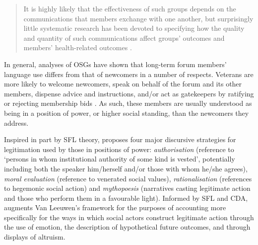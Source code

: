 \documentclass{article}
\renewcommand{\cite}{\parencite}
\begin{document}
\begin{quote}\small\singlespacing
It is highly likely that the effectiveness of such groups depends on the communications that members exchange with one another, but surprisingly little systematic research has been devoted to specifying how the quality and quantity of such communications affect groups' outcomes and members' health-related outcomes \parencite*[p.~1]{wang_stay_2012}.
\end{quote}

In general, analyses of OSGs have shown that long-term forum members' language use differs from that of newcomers in a number of respects. Veterans are more likely to welcome newcomers, speak on behalf of the forum and its other members, dispense advice and instructions, and\slash or act as gatekeepers by ratifying or rejecting membership bids \cite{paulus_`please_2015,pederson_supporting_2010,weber_missed_2011}. As such, these members are usually understood as being in a position of power, or higher social standing, than the newcomers they address.

Inspired in part by SFL theory, \textcite[p.~92]{van_leeuwen_legitimation_2007} proposes four major discursive strategies for legitimation used by those in positions of power: \emph{authorisation} (reference to `persons in whom institutional authority of some kind is vested', potentially including both the speaker him\slash herself and\slash or those with whom he\slash she agrees), \emph{moral evaluation} (reference to venerated social values), \emph{rationalisation} (references to hegemonic social action) and \emph{mythopoesis} (narratives casting legitimate action and those who perform them in a favourable light). Informed by SFL and CDA, \textcite{reyes_strategies_2011} augments Van Leeuwen's framework for the purposes of accounting more specifically for the ways in which social actors construct legitimate action through the use of emotion, the description of hypothetical future outcomes, and through displays of altruism. %
\end{document}
